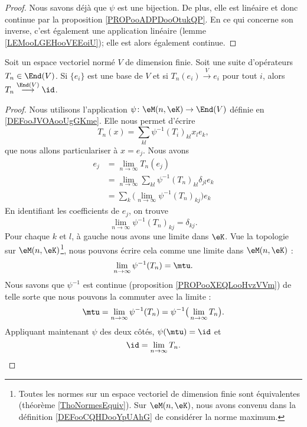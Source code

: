 \begin{proof}
	Nous savons déjà que \( \psi\) est une bijection. De plus, elle est linéaire et donc continue par la proposition \ref{PROPooADPDooOtukQP}. En ce qui concerne son inverse, c'est également une application linéaire (lemme \ref{LEMooLGEHooVEEoiU}); elle est alors également continue.
\end{proof}
\begin{proposition}     \label{PROPooDRHMooYzXbkl}
	Soit un espace vectoriel normé \( V\) de dimension finie. Soit une suite d'opérateurs \( T_n\in \End(V)\). Si \( \{ e_i \}\) est une base de \( V\) et si \( T_n(e_i)\stackrel{V}{\longrightarrow}e_i\) pour tout \( i\), alors \( T_n\stackrel{\End(V)}{\longrightarrow}\id\).
\end{proposition}

\begin{proof}
	Nous utilisons l'application \( \psi\colon \eM(n,\eK)\to \End(V)\) définie en \ref{DEFooJVOAooUgGKme}. Elle nous permet d'écrire
	\begin{equation}
		T_n(x)=\sum_{kl}\psi^{-1}(T_i)_{kl}x_le_k,
	\end{equation}
	que nous allons particulariser à \( x=e_j\). Nous avons
	\begin{subequations}
		\begin{align}
			e_j & =\lim_{n\to \infty} T_n(e_j)                                   \\
			    & =\lim_{n\to \infty} \sum_{kl}\psi^{-1}(T_n)_{kl}\delta_{jl}e_k \\
			    & =\sum_{k}\big( \lim_{n\to \infty} \psi^{-1}(T_n)_{kj} \big)e_k
		\end{align}
	\end{subequations}
	En identifiant les coefficients de \( e_j\), on trouve
	\begin{equation}
		\lim_{n\to \infty} \psi^{-1}(T_n)_{kj}=\delta_{kj}.
	\end{equation}
	Pour chaque \( k\) et \( l\), à gauche nous avons une limite dans \( \eK\). Vue la topologie sur \( \eM(n,\eK)\)\footnote{Toutes les normes sur un espace vectoriel de dimension finie sont équivalentes (théorème \ref{ThoNormesEquiv}). Sur \( \eM(n,\eK)\), nous avons convenu dans la définition \ref{DEFooCQHDooYpUAhG} de considérer la norme maximum.}, nous pouvons écrire cela comme une limite dans \( \eM(n,\eK)\) :
	\begin{equation}
		\lim_{n\to \infty} \psi^{-1}(T_n)=\mtu.
	\end{equation}
	Nous savons que \( \psi^{-1}\) est continue (proposition \ref{PROPooXEQLooHvzVVm}) de telle sorte que nous pouvons la commuter avec la limite :
	\begin{equation}
		\mtu= \lim_{n\to \infty} \psi^{-1}(T_n)=\psi^{-1}\big( \lim_{n\to \infty} T_n \big).
	\end{equation}
	Appliquant maintenant \( \psi\) des deux côtés, \( \psi(\mtu)=\id\) et
	\begin{equation}
		\id=\lim_{n\to \infty} T_n.
	\end{equation}
\end{proof}


